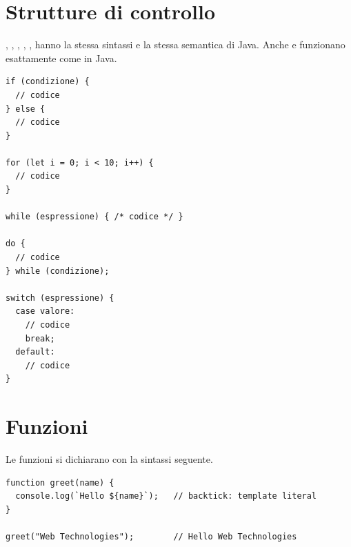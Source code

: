 \section{Strutture di controllo}

, , , , , 
hanno la stessa sintassi e la stessa semantica di Java. Anche  e
 funzionano esattamente come in Java.

\begin{lstlisting}[style=js, name=controllo.js]
if (condizione) {
  // codice
} else {
  // codice
}

for (let i = 0; i < 10; i++) {
  // codice
}

while (espressione) { /* codice */ }

do {
  // codice
} while (condizione);

switch (espressione) {
  case valore:
    // codice
    break;
  default:
    // codice
}
\end{lstlisting}

\section{Funzioni}

Le funzioni si dichiarano con la sintassi seguente.

\begin{affianco}[0.55][c]
\begin{lstlisting}[style=js, name=funzioni.js]
function greet(name) {
  console.log(`Hello ${name}`);   // backtick: template literal
}

greet("Web Technologies");        // Hello Web Technologies
\end{lstlisting}
\risultato
\begin{immagine}
\end{immagine}
\end{affianco}

